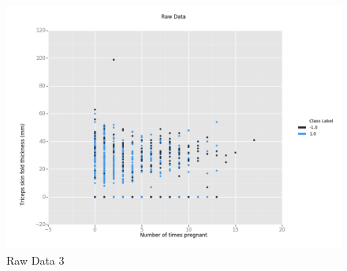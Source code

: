 \documentclass[12pt]{article}
\begin{document}
\begin{figure}[H]
\begin{center}
\includegraphics[scale=0.66]{raw3.png}
\caption{Raw Data 3}
\label{Raw Data 3}
\end{center}
\end{figure}
\end{document}
